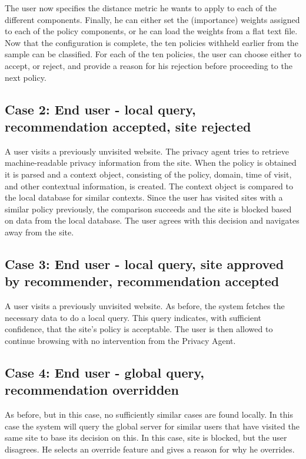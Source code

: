 The user now specifies the distance metric he wants to apply to each of the different components. Finally, he can either set the (importance) weights assigned to each of the policy components, or he can load the weights from a flat text file. Now that the configuration is complete, the ten policies withheld earlier from the sample can be classified. For each of the ten policies, the user can choose either to accept, or reject, and provide a reason for his rejection before proceeding to the next policy. 

\subsection*{Case 2: End user - local query, recommendation accepted, site rejected}
A user visits a previously unvisited website. The privacy agent tries to retrieve machine-readable privacy information from the site. When the policy is obtained it is parsed and a context object, consisting of the policy, domain, time of visit, and other contextual information, is created. The context object is compared to the local database for similar contexts. Since the user has visited sites with a similar policy previously, the comparison succeeds and the site is blocked based on data from the local database. The user agrees with this decision and navigates away from the site.

\subsection*{Case 3: End user - local query, site approved by recommender, recommendation accepted}
A user visits a previously unvisited website. As before, the system fetches the necessary data to do a local query. This query indicates, with sufficient confidence, that the site's policy is acceptable. The user is then allowed to continue browsing with no intervention from the Privacy Agent.

\subsection*{Case 4: End user - global query, recommendation overridden}
As before, but in this case, no sufficiently similar cases are found locally. In this case the system will query the global server for similar users that have visited the same site to base its decision on this. In this case, site is blocked, but the user disagrees. He selects an override feature and gives a reason for why he overrides.

